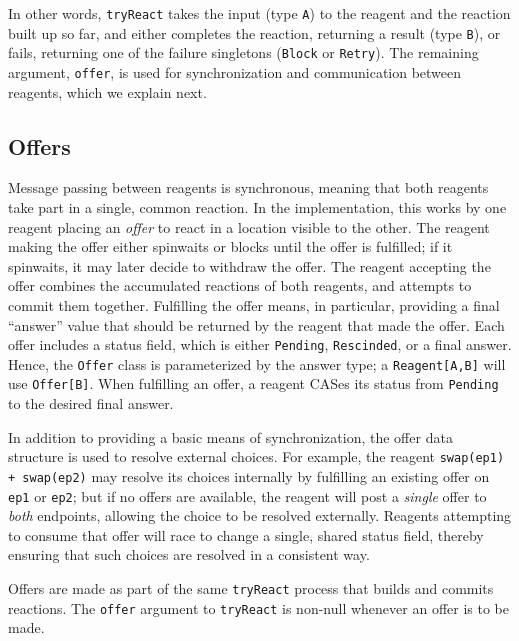 \documentclass[preprint,nocopyrightspace]{sigplanconf}
\begin{document}
In other words, \lstinline{tryReact} takes the input (type \lstinline{A}) to
the reagent and the reaction built up so far, and either completes the
reaction, returning a result (type \lstinline{B}), or fails, returning one of
the failure singletons (\lstinline{Block} or \lstinline{Retry}).  The
remaining argument, \lstinline{offer}, is used for synchronization and
communication between reagents, which we explain next.

\subsection{Offers}
\label{sec:offers}

Message passing between reagents is synchronous, meaning that both reagents take
part in a single, common reaction.  In the implementation, this works by one
reagent placing an \emph{offer} to react in a location visible to the other.
The reagent making the offer either spinwaits or blocks until the offer is
fulfilled; if it spinwaits, it may later decide to withdraw the offer.  The
reagent accepting the offer combines the accumulated reactions of both reagents,
and attempts to commit them together. Fulfilling the offer means, in particular,
providing a final ``answer'' value that should be returned by the reagent that
made the offer.  Each offer includes a status field, which is either
\lstinline{Pending}, \lstinline{Rescinded}, or a final answer.  Hence, the
\lstinline{Offer} class is parameterized by the answer type; a
\lstinline{Reagent[A,B]} will use \lstinline{Offer[B]}.  When fulfilling an
offer, a reagent CASes its status from \lstinline{Pending} to the desired final
answer.

In addition to providing a basic means of synchronization, the offer data
structure is used to resolve external choices.  For example, the reagent
\lstinline{swap(ep1) + swap(ep2)} may resolve its choices internally by
fulfilling an existing offer on \lstinline{ep1} or \lstinline{ep2}; but if no
offers are available, the reagent will post a \emph{single} offer to \emph{both}
endpoints, allowing the choice to be resolved externally.  Reagents attempting
to consume that offer will race to change a single, shared status field, thereby
ensuring that such choices are resolved in a consistent way.

Offers are made as part of the same \lstinline{tryReact} process that builds and
commits reactions.  The \lstinline{offer} argument to \lstinline{tryReact} is
non-null whenever an offer is to be made.
\end{document}
